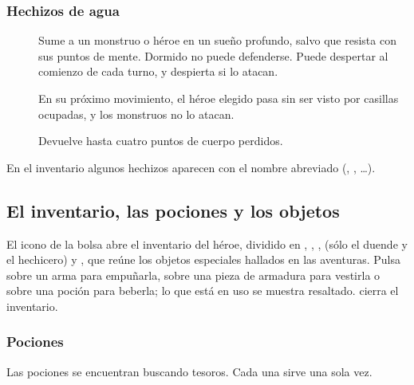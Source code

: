 \subsubsection*{Hechizos de agua}
\begin{description}
\item[] Sume a un monstruo o héroe en un sueño profundo, salvo
  que resista con sus puntos de mente. Dormido no puede defenderse. Puede
  despertar al comienzo de cada turno, y despierta si lo atacan.
\item[] En su próximo movimiento, el héroe elegido
  pasa sin ser visto por casillas ocupadas, y los monstruos no lo atacan.
\item[] Devuelve hasta cuatro puntos de cuerpo
  perdidos.
\end{description}

En el inventario algunos hechizos aparecen con el nombre abreviado
(, , \ldots).

\subsection{El inventario, las pociones y los objetos}

El icono de la bolsa abre el inventario del héroe, dividido en
, , ,  (sólo el
duende y el hechicero) y , que reúne los objetos
especiales hallados en las aventuras. Pulsa sobre un arma para empuñarla,
sobre una pieza de armadura para vestirla o sobre una poción para beberla;
lo que está en uso se muestra resaltado.  cierra el
inventario.


\subsubsection*{Pociones}

Las pociones se encuentran buscando tesoros. Cada una sirve una sola vez.

